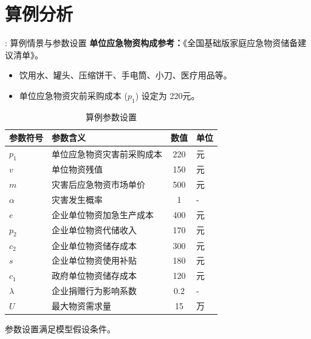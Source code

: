 \documentclass[9pt]{beamer}
\begin{document}
\section{算例分析}
\begin{frame}{\insertsectionhead: 算例情景与参数设置}
    \textbf{单位应急物资构成参考：}《全国基础版家庭应急物资储备建议清单》\cite{china_emergency_management_2020}。
    \begin{itemize}
        \item 饮用水、罐头、压缩饼干、手电筒、小刀、医疗用品等。
        \item 单位应急物资灾前采购成本 ($p_1$) 设定为 220元。
    \end{itemize}
    \begin{table}
    \centering
    \caption{算例参数设置}
\small
    \begin{tabular}{llcl}
    \toprule
    参数符号 & 参数含义                     & 数值    & 单位 \\
    \midrule
    $p_1$      & 单位应急物资灾害前采购成本   & 220 & 元   \\
    $v$        & 单位物资残值                 & 150   & 元   \\
    $m$        & 灾害后应急物资市场单价       & 500   & 元   \\
    $\alpha$   & 灾害发生概率                 & 1     & -    \\
    $e$        & 企业单位物资加急生产成本     & 400   & 元   \\
    $p_2$      & 企业单位物资代储收入         & 170   & 元   \\
    $c_2$      & 企业单位物资储存成本         & 300    & 元   \\
    $s$        & 企业单位物资使用补贴         & 180   & 元   \\
    $c_1$      & 政府单位物资储存成本         & 120   & 元   \\
    $\lambda$  & 企业捐赠行为影响系数         & 0.2   & -    \\
    $U$        & 最大物资需求量               & 15 & 万 \\
    \bottomrule
    \end{tabular}
    \end{table}
    参数设置满足模型假设条件。
\end{frame}
\end{document}
